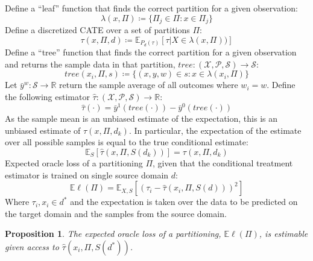 \documentclass[a4paper,12pt]{article}
\theoremstyle{proposition}
\newtheorem{proposition}{Proposition}[section]
\newcommand{\Ex}{\mathbb{E}}
\begin{document}
Define a ``leaf'' function that finds the correct partition for a given observation:
$$
\lambda(x, \Pi) \coloneqq \{\Pi_j \in \Pi : x \in \Pi_j \}
$$
%
Define a discretized CATE over a set of partitions $\Pi$:
%
$$
\tau(x, \Pi, d) \coloneqq \mathbb{E}_{P_d(\tau)}[\tau | X \in \lambda(x, \Pi))]
$$
%
Define a ``tree'' function that finds the correct partition for a given observation and returns the sample data in that partition, $tree : (\mathcal{X}, \mathcal{P}, \mathcal{S}) \rightarrow \mathcal{S}$:
$$
tree(x_i, \Pi, s) \coloneqq \{(x, y, w) \in s : x \in \lambda(x_i, \Pi) \}
$$
%
Let $\bar{y}^w: \mathcal{S} \rightarrow \mathbb{R}$ return the sample average of all outcomes where $w_i = w$. Define the following estimator $\hat{\tau}: (\mathcal{X}, \mathcal{P}, \mathcal{S}) \rightarrow \mathbb{R}$:
%
$$
\hat{\tau}(\cdot) =  \bar{y}^1(tree(\cdot)) - \bar{y}^0(tree(\cdot))
$$
%
As the sample mean is an unbiased estimate of the expectation, this is an unbiased estimate of $\tau(x,\Pi, d_k)$. In particular, the expectation of the estimate over all possible samples is equal to the true conditional estimate:
$$
\Ex_{S}[\hat{\tau}(x, \Pi, S(d_k))] = \tau(x,\Pi, d_k)
$$
%
Expected oracle loss of a partitioning $\Pi$, given that the conditional treatment estimator is trained on single source domain $d$:
%
$$
\mathbb{E} \ell(\Pi) = \mathbb{E}_{X, S} [ (\tau_i - \hat{\tau}(x_i, \Pi, S(d)))^2  ]
$$
%
Where $\tau_i, x_i \in d^*$ and the expectation is taken over the data to be predicted on the target domain and the samples from the source domain.

\begin{proposition}
The expected oracle loss of a partitioning, $\mathbb{E} \ell(\Pi)$, is estimable given access to $\hat{\tau}(x_i, \Pi, S(d^*))$.
\end{proposition}
\end{document}
